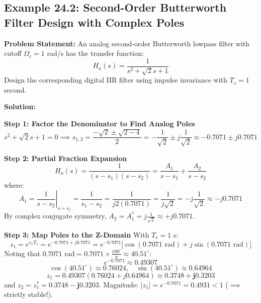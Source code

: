 \documentclass[11pt,a4paper]{article}
\begin{document}
\vspace{2mm}
\subsection{Example 24.2: Second-Order Butterworth Filter Design with Complex Poles}
\textbf{Problem Statement:} An analog second-order Butterworth lowpass filter with cutoff $\Omega_c = 1$ rad/s has the transfer function:
\begin{equation}
H_a(s) = \frac{1}{s^2 + \sqrt{2} s + 1}
\end{equation}
Design the corresponding digital IIR filter using impulse invariance with $T_s = 1$ second.

\vspace{1mm}
\noindent\textbf{Solution:}

\noindent\textbf{Step 1: Factor the Denominator to Find Analog Poles}
\begin{equation}
s^2 + \sqrt{2} s + 1 = 0 \implies s_{1,2} = \frac{-\sqrt{2} \pm \sqrt{2 - 4}}{2} = -\frac{1}{\sqrt{2}} \pm j \frac{1}{\sqrt{2}} \approx -0.7071 \pm j 0.7071
\end{equation}

\noindent\textbf{Step 2: Partial Fraction Expansion}
\begin{equation}
H_a(s) = \frac{1}{(s - s_1)(s - s_2)} = \frac{A_1}{s - s_1} + \frac{A_2}{s - s_2}
\end{equation}
where:
\begin{equation}
A_1 = \left. \frac{1}{s - s_2} \right|_{s = s_1} = \frac{1}{s_1 - s_2} = \frac{1}{j 2(0.7071)} = \frac{1}{j \sqrt{2}} = -j \frac{1}{\sqrt{2}} \approx -j 0.7071
\end{equation}
By complex conjugate symmetry, $A_2 = A_1^* = j \frac{1}{\sqrt{2}} \approx +j 0.7071$.

\noindent\textbf{Step 3: Map Poles to the Z-Domain}
With $T_s = 1$ s:
\begin{equation}
z_1 = e^{s_1 T_s} = e^{-0.7071 + j 0.7071} = e^{-0.7071} \big[\cos(0.7071 \text{ rad}) + j \sin(0.7071 \text{ rad})\big]
\end{equation}
Noting that $0.7071 \text{ rad} = 0.7071 \times \frac{180^\circ}{\pi} \approx 40.51^\circ$:
\begin{equation}
e^{-0.7071} \approx 0.49307
\end{equation}
\begin{equation}
\cos(40.51^\circ) \approx 0.76024, \quad \sin(40.51^\circ) \approx 0.64964
\end{equation}
\begin{equation}
z_1 = 0.49307(0.76024 + j 0.64964) \approx \mathbf{0.3748 + j 0.3203}
\end{equation}
and $z_2 = z_1^* = \mathbf{0.3748 - j 0.3203}$.
Magnitude: $|z_1| = e^{-0.7071} = 0.4931 < 1$ ($\implies$ strictly stable!).
\end{document}
